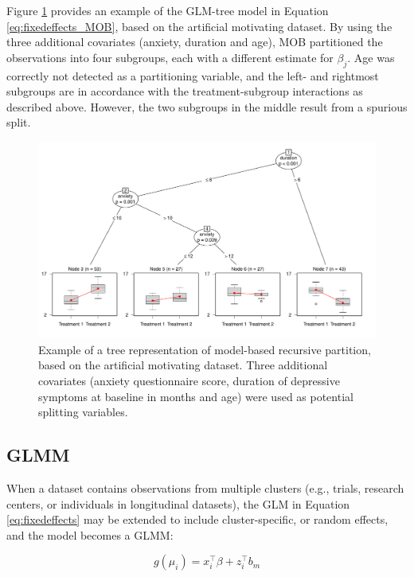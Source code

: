 \documentclass[nobf,doc]{apa}
\begin{document}
Figure \ref{fig:example_mobtree} provides an example of the GLM-tree model in Equation \ref{eq:fixedeffects_MOB}, based on the artificial motivating dataset. By using the three additional covariates (anxiety, duration and age), MOB partitioned the observations into four subgroups, each with a different estimate for $\beta_j$. Age was correctly not detected as a partitioning variable, and the left- and rightmost subgroups are in accordance with the treatment-subgroup interactions as described above. However, the two subgroups in the middle result from a spurious split.

\begin{figure}[!h]
    \includegraphics[width=15cm]{glmtree_example.pdf}
    \caption{Example of a tree representation of model-based recursive partition, based on the artificial motivating dataset. Three additional covariates (anxiety questionnaire score, duration of depressive symptoms at baseline in months and age) were used as potential splitting variables.}
    \label{fig:example_mobtree}
\end{figure}



\subsection{GLMM}
When a dataset contains observations from multiple clusters (e.g., trials, research centers, or individuals in longitudinal datasets), the GLM in Equation \ref{eq:fixedeffects} may be extended to include cluster-specific, or random effects, and the model becomes a GLMM:

\begin{equation}
\label{eq:mixedeffects}
	g(\mu_{i}) = x_{i}^{\top}\beta + z_{i}^{\top}b_{m}
\end{equation}
\end{document}
